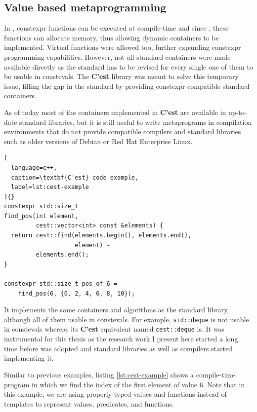 \documentclass[../main]{subfiles}
\begin{document}
\subsection{
  Value based metaprogramming
}

In \cpp, \gls{constexpr} functions can be executed at compile-time and since
, these functions can allocate memory, thus allowing dynamic containers
to be implemented. Virtual functions were allowed too, further expanding
\gls{constexpr} programming capabilities.
However, not all standard containers were made available directly as
the standard has to be revised for every single one of them to be
usable in \glspl{consteval}. The \textbf{C'est} \cite{cest} library was meant to solve
this temporary issue, filling the gap in the \cpp standard by providing
\gls{constexpr} compatible standard containers.

As of today most of the containers implemented in \textbf{C'est} are available in
up-to-date standard libraries, but it is still useful to write metaprograms
in compilation environments that do not provide  compatible compilers
and standard libraries such as older versions of Debian
or Red Hat Enterprise Linux.

\begin{lstlisting}[
  language=c++,
  caption=\textbf{C'est} code example,
  label=lst:cest-example
]{}
constexpr std::size_t
find_pos(int element,
         cest::vector<int> const &elements) {
  return cest::find(elements.begin(), elements.end(),
                    element) -
         elements.end();
}

constexpr std::size_t pos_of_6 =
    find_pos(6, {0, 2, 4, 6, 8, 10});
\end{lstlisting}

It implements the same containers and algorithms as the \cpp standard library,
although all of them usable in \glspl{consteval}. For example,
\lstinline{std::deque} is not usable in \glspl{consteval} whereas
its \textbf{C'est} equivalent named \lstinline{cest::deque} is.
It was instrumental for this thesis as the research work I present here started
a long time before  was adopted and standard libraries as well as
compilers started implementing it.

Similar to previous examples, listing \ref{lst:cest-example} shows a
compile-time program in which we find the index of the first element of value 6.
Note that in this example, we are using properly typed values and functions
instead of templates to represent values, predicates, and functions.
\end{document}
